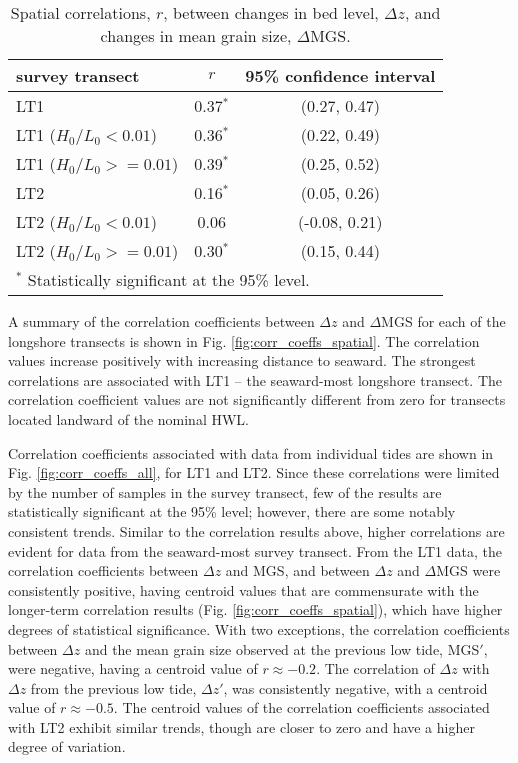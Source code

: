 \documentclass[preprint,12pt,authoryear]{elsarticle}
\begin{document}
\begin{table}[tbp!]
	\caption[Spatial correlations between changes in bed level and changes in mean grain size]{Spatial correlations, $r$, between changes in bed level, $\Delta z$, and changes in mean grain size, $\Delta$MGS.} 
	\label{table:spatial_correlations}
	\centering
	\begin{tabular}{lcc}
		\hline
		survey transect & $r$ & 95\% confidence interval\\
		\hline
		LT1 & 0.37$^{*}$ & (0.27, 0.47)\\
		LT1 ($H_0/L_0 < 0.01$) & 0.36$^{*}$ & (0.22, 0.49)\\
		LT1 ($H_0/L_0 >= 0.01$) & 0.39$^{*}$ & (0.25, 0.52)\\
		LT2 & 0.16$^{*}$ & (0.05, 0.26)\\
		LT2 ($H_0/L_0 < 0.01$) & 0.06 & (-0.08, 0.21)\\
		LT2 ($H_0/L_0 >= 0.01$) & 0.30$^{*}$ & (0.15, 0.44)\\
		\hline
		\multicolumn{3}{l}{$^{*}$ Statistically significant at the 95\% level.}
	\end{tabular}
\end{table}

A summary of the correlation coefficients between $\Delta z$ and $\Delta$MGS for each of the longshore transects is shown in Fig. \ref{fig:corr_coeffs_spatial}. The correlation values increase positively with increasing distance to seaward. The strongest correlations are associated with LT1 -- the seaward-most longshore transect. The correlation coefficient values are not significantly different from zero for transects located landward of the nominal HWL.

Correlation coefficients associated with data from individual tides are shown in Fig. \ref{fig:corr_coeffs_all}, for LT1 and LT2. Since these correlations were limited by the number of samples in the survey transect, few of the results are statistically significant at the 95\% level; however, there are some notably consistent trends. Similar to the correlation results above, higher correlations are evident for data from the seaward-most survey transect. From the LT1 data, the correlation coefficients between $\Delta z$ and MGS, and between $\Delta z$ and $\Delta$MGS were consistently positive, having centroid values that are commensurate with the longer-term correlation results (Fig. \ref{fig:corr_coeffs_spatial}), which have higher degrees of statistical significance. With two exceptions, the correlation coefficients between $\Delta z$ and the mean grain size observed at the previous low tide, MGS$'$, were negative, having a centroid value of $r\approx -0.2$. The correlation of $\Delta z$ with $\Delta z$ from the previous low tide, $\Delta z'$, was consistently negative, with a centroid value of $r\approx -0.5$. The centroid values of the correlation coefficients associated with LT2 exhibit similar trends, though are closer to zero and have a higher degree of variation. 
\end{document}
